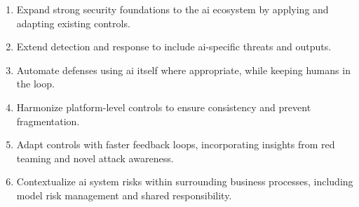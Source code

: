 \begin{enumerate}
\item Expand strong security foundations to the \gls{ai} ecosystem by applying and adapting existing controls.
\item Extend detection and response to include \gls{ai}-specific threats and outputs.
\item Automate defenses using \gls{ai} itself where appropriate, while keeping humans in the loop.
\item Harmonize platform-level controls to ensure consistency and prevent fragmentation.
\item Adapt controls with faster feedback loops, incorporating insights from red teaming and novel attack awareness.
\item Contextualize \gls{ai} system risks within surrounding business processes, including model risk management and shared responsibility.
\end{enumerate}

